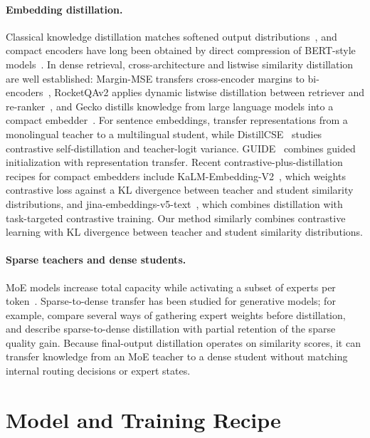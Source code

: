 \documentclass[11pt]{article}
\begin{document}
\paragraph{Embedding distillation.}
Classical knowledge distillation matches softened output distributions~\citep{hinton2015distilling}, and compact encoders have long been obtained by direct compression of BERT-style models~\citep{sun2019patient,sanh2019distilbert,jiao2020tinybert,sun2020mobilebert}.
In dense retrieval, cross-architecture and listwise similarity distillation are well established: Margin-MSE transfers cross-encoder margins to bi-encoders~\citep{hofstaetter2020improving}, RocketQAv2 applies dynamic listwise distillation between retriever and re-ranker~\citep{ren2021rocketqav2}, and Gecko distills knowledge from large language models into a compact embedder~\citep{lee2024gecko}.
For sentence embeddings, \citet{reimers2020multilingual} transfer representations from a monolingual teacher to a multilingual student, while DistillCSE~\citep{xu2023distillcse} studies contrastive self-distillation and teacher-logit variance.
GUIDE~\citep{trinh2025guide} combines guided initialization with representation transfer.
Recent contrastive-plus-distillation recipes for compact embedders include KaLM-Embedding-V2~\citep{zhao2026kalm}, which weights contrastive loss against a KL divergence between teacher and student similarity distributions, and jina-embeddings-v5-text~\citep{akram2026jina}, which combines distillation with task-targeted contrastive training.
Our method similarly combines contrastive learning with KL divergence between teacher and student similarity distributions.

\paragraph{Sparse teachers and dense students.}
MoE models increase total capacity while activating a subset of experts per token~\citep{shazeer2017outrageously,fedus2022switch,jiang2024mixtral}.
Sparse-to-dense transfer has been studied for generative models; for example, \citet{xue2022one} compare several ways of gathering expert weights before distillation, and \citet{fedus2022switch} describe sparse-to-dense distillation with partial retention of the sparse quality gain.
Because final-output distillation operates on similarity scores, it can transfer knowledge from an MoE teacher to a dense student without matching internal routing decisions or expert states.

\section{Model and Training Recipe}
\label{sec:method}
\end{document}
